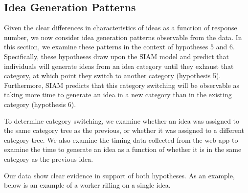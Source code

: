 \subsection{Idea Generation Patterns}
Given the clear differences in characteristics of ideas as a function of response number, we now consider idea generation patterns observable from the data. In this section, we examine these patterns in the context of hypotheses 5 and 6. Specifically, these hypotheses draw upon the SIAM model and predict that individuals will generate ideas from an idea category until they exhaust that category, at which point they switch to another category (hypothesis 5). Furthermore, SIAM predicts that this category switching will be observable as taking more time to generate an idea in a new category than in the existing category (hypothesis 6).

To determine category switching, we examine whether an idea was assigned to the same category tree as the previous, or whether it was assigned to a different category tree. We also examine the timing data collected from the web app to examine the time to generate an idea as a function of whether it is in the same category as the previous idea.

Our data show clear evidence in support of both hypotheses. As an example, below is an example of a worker riffing on a single idea.




